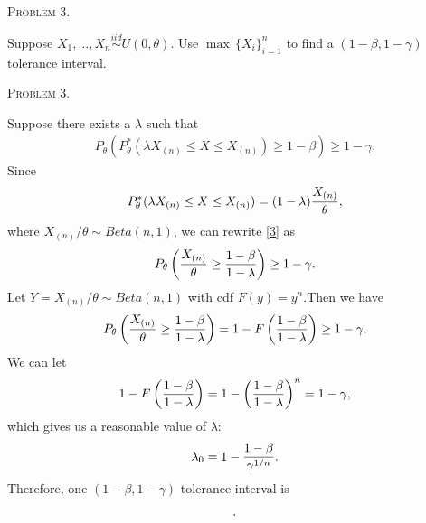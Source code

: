 \documentclass{article}
\begin{document}
\begin{CJK}{UTF8}{gbsn}
    \begin{shaded}
        \noindent\textsc{Problem 3.}\par
        Suppose $X_1, \ldots, X_n\mathop{\sim}\limits^{iid}U(0, \theta)$. Use $\max\,\{ X_i\}_{i=1}^n$ to find a
        $(1-\beta, 1-\gamma)$ tolerance interval.
    \end{shaded}
    \noindent\textsc{Problem 3.}\par
    Suppose there exists a $\lambda$ such that
    \begin{align}
        P_{\theta}(P^*_{\theta}(\lambda X_{(n)} \leq X \leq X_{(n)})\geq 1-\beta) \geq 1 - \gamma.\label{3}
    \end{align}
    Since
    \begin{align}
        P_{\theta}^* (\lambda X_{(n)} \leq X \leq X_{(n)}) = (1-\lambda) \frac{X_{(n)}}{\theta},\notag
    \end{align}
    where $X_{(n)}/\theta \sim Beta(n, 1)$, we can rewrite \eqref{3} as
    \begin{align}
        P_{\theta} \left (\frac{X_{(n)}}{\theta}\geq \frac{1-\beta}{1-\lambda}\right ) \geq 1-\gamma.\notag
    \end{align}
    Let $Y=X_{(n)}/\theta \sim Beta(n, 1)$ with cdf $F(y)=y^n$.Then we have
    \begin{align}
        P_{\theta} \left (\frac{X_{(n)}}{\theta}\geq \frac{1-\beta}{1-\lambda}\right )  = 1 - F\left (\frac{1-\beta}{1-\lambda} \right ) \geq 1-\gamma.\notag
    \end{align}
    We can let
    \begin{align}
        1 - F\left (\frac{1-\beta}{1-\lambda} \right )  = 1 - \left (\frac{1-\beta}{1-\lambda} \right )^n= 1-\gamma,\notag
    \end{align}
    which gives us a reasonable value of $\lambda$:
    \begin{align}
        \lambda_0 =1 - \frac{1-\beta}{\gamma^{1/n}}.\notag
    \end{align}
    Therefore, one $(1-\beta, 1-\gamma)$ tolerance interval is
    \begin{align}
        [\,\lambda_0 X_{(n)},\,\, X_{(n)}\,].\notag
    \end{align}



\end{CJK}
\end{document}
